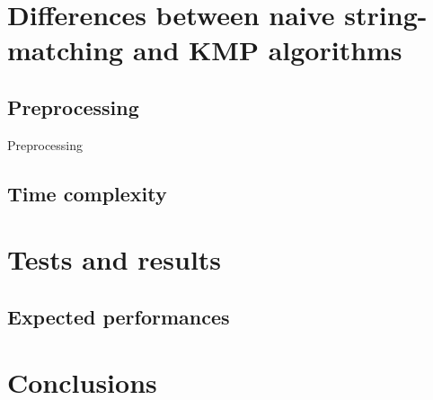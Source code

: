 \documentclass[11pt]{article}
\begin{document}
    \section{Differences between naive string-matching and KMP algorithms} \label{sec:naive_kmp_differences}

        \subsection{Preprocessing} \label{subsec:preprocessing}

            Preprocessing

        \subsection{Time complexity} \label{subsec:naive_kmp_time_complexity}

            \begin{table}[H]
                \centering
                \caption{Time complexity of the naive and KMP algorithms.}
                \label{tab:naive_kmp_time_complexity}
            \end{table}

    \section{Tests and results} \label{sec:tests_and_results}

        \subsection{Expected performances} \label{subsec:expected_performances}

    \section{Conclusions} \label{sec:conclusions}
\end{document}
